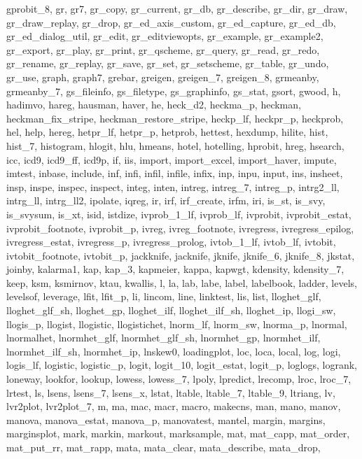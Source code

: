 {{    gprobit_8, gr, gr7, gr_copy, gr_current, gr_db, gr_describe, gr_dir, gr_draw, gr_draw_replay, gr_drop, gr_ed_axis_custom, gr_ed_capture, gr_ed_db, gr_ed_dialog_util, gr_edit, gr_editviewopts, gr_example, gr_example2,
    gr_export, gr_play, gr_print, gr_qscheme, gr_query, gr_read, gr_redo, gr_rename, gr_replay, gr_save, gr_set, gr_setscheme, gr_table, gr_undo, gr_use, graph, graph7, grebar, greigen, greigen_7, greigen_8, grmeanby,
    grmeanby_7, gs_fileinfo, gs_filetype, gs_graphinfo, gs_stat, gsort, gwood, h, hadimvo, hareg, hausman, haver, he, heck_d2, heckma_p, heckman, heckman_fix_stripe, heckman_restore_stripe, heckp_lf, heckpr_p, heckprob,
    hel, help, hereg, hetpr_lf, hetpr_p, hetprob, hettest, hexdump, hilite, hist, hist_7, histogram, hlogit, hlu, hmeans, hotel, hotelling, hprobit, hreg, hsearch, icc, icd9, icd9_ff, icd9p, if, iis, import, import_excel,
    import_haver, impute, imtest, inbase, include, inf, infi, infil, infile, infix, inp, inpu, input, ins, insheet, insp, inspe, inspec, inspect, integ, inten, intreg, intreg_7, intreg_p, intrg2_ll, intrg_ll, intrg_ll2,
    ipolate, iqreg, ir, irf, irf_create, irfm, iri, is_st, is_svy, is_svysum, is_xt, isid, istdize, ivprob_1_lf, ivprob_lf, ivprobit, ivprobit_estat, ivprobit_footnote, ivprobit_p, ivreg, ivreg_footnote, ivregress,
    ivregress_epilog, ivregress_estat, ivregress_p, ivregress_prolog, ivtob_1_lf, ivtob_lf, ivtobit, ivtobit_footnote, ivtobit_p, jackknife, jacknife, jknife, jknife_6, jknife_8, jkstat, joinby, kalarma1, kap, kap_3,
    kapmeier, kappa, kapwgt, kdensity, kdensity_7, keep, ksm, ksmirnov, ktau, kwallis, l, la, lab, labe, label, labelbook, ladder, levels, levelsof, leverage, lfit, lfit_p, li, lincom, line, linktest, lis, list,
    lloghet_glf, lloghet_glf_sh, lloghet_gp, lloghet_ilf, lloghet_ilf_sh, lloghet_ip, llogi_sw, llogis_p, llogist, llogistic, llogistichet, lnorm_lf, lnorm_sw, lnorma_p, lnormal, lnormalhet, lnormhet_glf, lnormhet_glf_sh,
    lnormhet_gp, lnormhet_ilf, lnormhet_ilf_sh, lnormhet_ip, lnskew0, loadingplot, loc, loca, local, log, logi, logis_lf, logistic, logistic_p, logit, logit_10, logit_estat, logit_p, loglogs, logrank, loneway, lookfor,
    lookup, lowess, lowess_7, lpoly, lpredict, lrecomp, lroc, lroc_7, lrtest, ls, lsens, lsens_7, lsens_x, lstat, ltable, ltable_7, ltable_9, ltriang, lv, lvr2plot, lvr2plot_7, m, ma, mac, macr, macro, makecns, man, mano,
    manov, manova, manova_estat, manova_p, manovatest, mantel, margin, margins, marginsplot, mark, markin, markout, marksample, mat, mat_capp, mat_order, mat_put_rr, mat_rapp, mata, mata_clear, mata_describe, mata_drop,
}}
